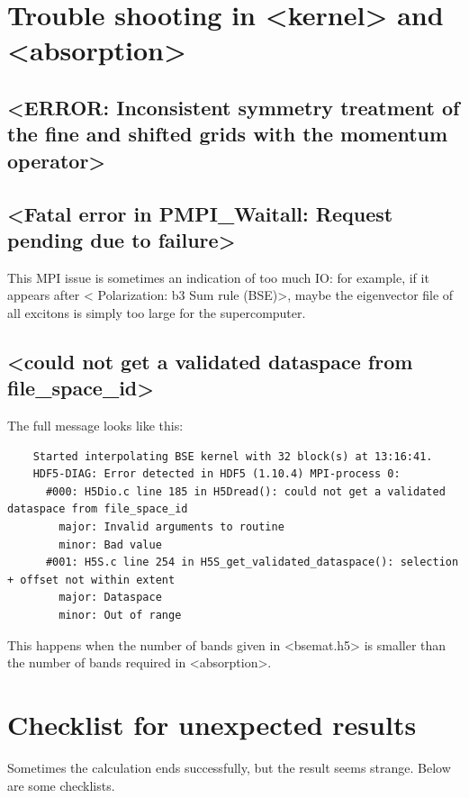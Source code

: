 \documentclass[hyperref, a4paper, 12pt]{report}
\def\texttt#1{<#1>}%
\newcommand{\shortcode}[1]{\texttt{#1}}
\begin{document}
\section{Trouble shooting in \shortcode{kernel} and \shortcode{absorption}}

\subsection{\shortcode{ERROR: Inconsistent symmetry treatment of the fine and shifted grids with the momentum operator}}

\subsection{\shortcode{Fatal error in PMPI_Waitall: Request pending due to failure}}

This MPI issue is sometimes an indication of too much IO: 
for example, if it appears after \shortcode{ Polarization: b3 Sum rule (BSE)}, 
maybe the eigenvector file of all excitons 
is simply too large for the supercomputer. 

\subsection{\shortcode{could not get a validated dataspace from file_space_id}}

The full message looks like this: 
\begin{lstlisting}
    Started interpolating BSE kernel with 32 block(s) at 13:16:41.
    HDF5-DIAG: Error detected in HDF5 (1.10.4) MPI-process 0:
      #000: H5Dio.c line 185 in H5Dread(): could not get a validated dataspace from file_space_id
        major: Invalid arguments to routine
        minor: Bad value
      #001: H5S.c line 254 in H5S_get_validated_dataspace(): selection + offset not within extent
        major: Dataspace
        minor: Out of range
\end{lstlisting}
This happens when the number of bands given in \shortcode{bsemat.h5} 
is smaller than the number of bands required in \shortcode{absorption}.

\section{Checklist for unexpected results}

Sometimes the calculation ends successfully,
but the result seems strange.
Below are some checklists.
\end{document}
